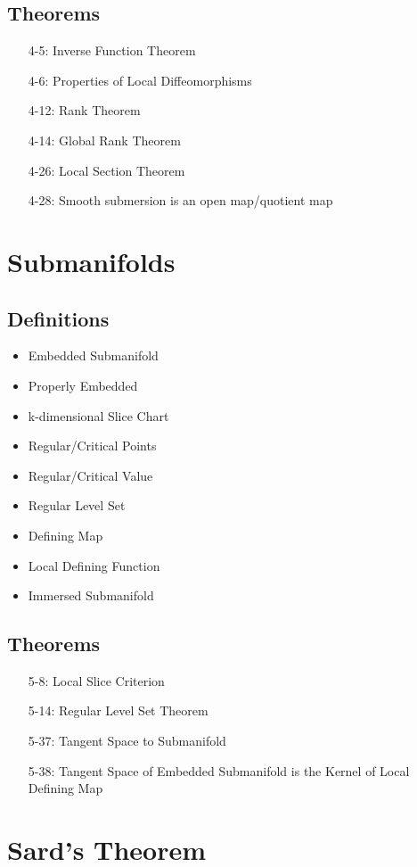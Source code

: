 \documentclass[11.5pt]{scrartcl}
\newcommand{\<}{\langle}
\renewcommand{\>}{\rangle}
\begin{document}
\subsection{Theorems}
\begin{itemize}
\item[4-5:] Inverse Function Theorem
\item[4-6:] Properties of Local Diffeomorphisms
\item[4-12:] Rank Theorem
\item[4-14:] Global Rank Theorem
\item[4-26:] Local Section Theorem
\item[4-28:] Smooth submersion is an open map/quotient map
\end{itemize}

\section{Submanifolds}


\subsection{Definitions}
\begin{itemize}
\item Embedded Submanifold
\item Properly Embedded
\item k-dimensional Slice Chart
\item Regular/Critical  Points
\item Regular/Critical Value
\item Regular Level Set
\item Defining Map
\item Local Defining Function
\item Immersed Submanifold
\end{itemize}
\subsection{Theorems}
\begin{itemize}
\item[5-8:] Local Slice Criterion
\item[5-14:] Regular Level Set Theorem 
\item[5-37:] Tangent Space to Submanifold
\item[5-38:] Tangent Space of Embedded Submanifold is the Kernel of Local Defining Map
\end{itemize}
\section{Sard's Theorem}
\end{document}
